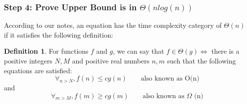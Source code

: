 \documentclass[10pt,a4paper]{article}
\theoremstyle{definition}
\newtheorem{defn}{Definition}
\begin{document}
\subsubsection{Step 4: Prove Upper Bound is in $\Theta(n log(n))$}
According to our notes, an equation has the time complexity category of $\Theta(n)$ if it satisfies the following definition:
  \begin{defn}
    For functions $f$ and $g$, we can say that $f \in \Theta(g) \iff $ there is a positive integers $N,M$ and positive real numbers $n,m$ such that the following equations are satisfied:
    \begin{equation*}
      \forall_{ n > N}, f(n) \leq cg(n) \qquad \text{also known as O(n)}
    \end{equation*}
    and
    \begin{equation*}
      \forall_{ m > M}, f(m) \geq cg(m) \qquad \text{also known as }\Omega\text{ (n)}
    \end{equation*}
  \end{defn}
\end{document}
